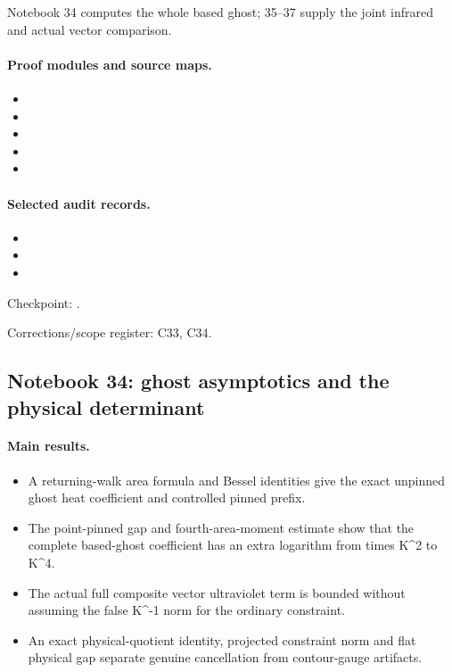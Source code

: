 Notebook 34 computes the whole based ghost; 35--37 supply the joint infrared and actual vector comparison.

\paragraph{Proof modules and source maps.}
\begingroup\small
\begin{itemize}
\item {}
\item {}
\item {}
\item {}
\item {}
\end{itemize}
\endgroup

\paragraph{Selected audit records.}
\begingroup\small
\begin{itemize}
\item {}
\item {}
\item {}
\end{itemize}
\endgroup

Checkpoint: .\par
Corrections/scope register: C33, C34.\par

\subsection{Notebook 34: ghost asymptotics and the physical determinant}
\label{hnc-34}
\noindent{}\par

\paragraph{Main results.}
\begin{itemize}
\item A returning-walk area formula and Bessel identities give the exact unpinned ghost heat coefficient and controlled pinned prefix.
\item The point-pinned gap and fourth-area-moment estimate show that the complete based-ghost coefficient has an extra logarithm from times K\textasciicircum{}2 to K\textasciicircum{}4.
\item The actual full composite vector ultraviolet term is bounded without assuming the false K\textasciicircum{}-1 norm for the ordinary constraint.
\item An exact physical-quotient identity, projected constraint norm and flat physical gap separate genuine cancellation from contour-gauge artifacts.
\end{itemize}


